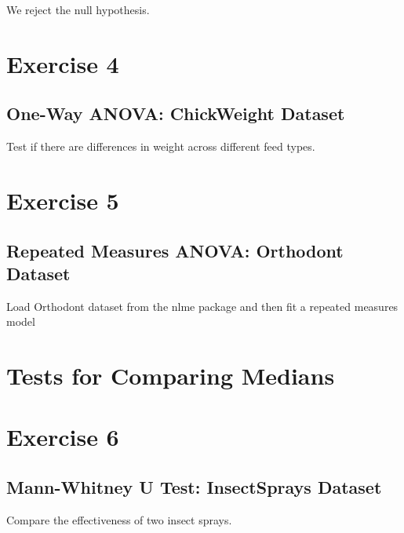 \documentclass[
]{book}
\begin{document}
We reject the null hypothesis.

\section*{Exercise 4}\label{exercise-4-3}

\subsection*{One-Way ANOVA: ChickWeight Dataset}\label{one-way-anova-chickweight-dataset}

Test if there are differences in weight across different feed types.

\section*{Exercise 5}\label{exercise-5-3}

\subsection*{Repeated Measures ANOVA: Orthodont Dataset}\label{repeated-measures-anova-orthodont-dataset}

Load Orthodont dataset from the nlme package and then fit a repeated measures model

\section*{Tests for Comparing Medians}\label{tests-for-comparing-medians}

\section*{Exercise 6}\label{exercise-6}

\subsection{Mann-Whitney U Test: InsectSprays Dataset}\label{mann-whitney-u-test-insectsprays-dataset}

Compare the effectiveness of two insect sprays.
\end{document}
